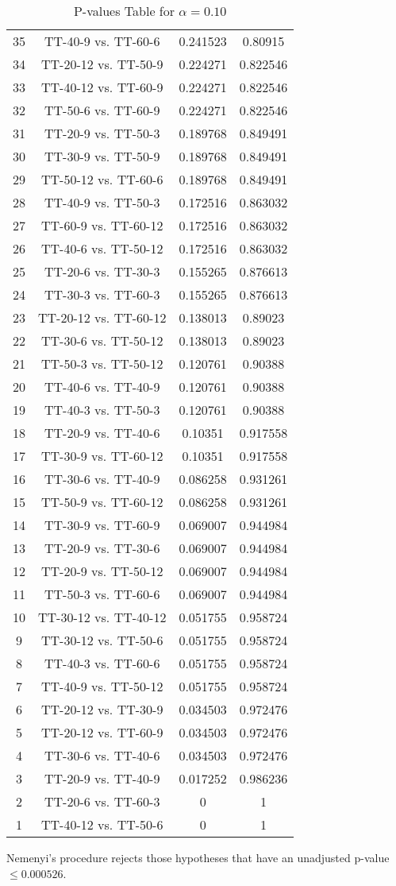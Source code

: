 \documentclass[a4paper,10pt]{article}
\begin{document}
\begin{landscape}
\begin{table}[!htp]
\begin{tabular}{cccc}
35&TT-40-9 vs. TT-60-6&0.241523&0.80915\\
34&TT-20-12 vs. TT-50-9&0.224271&0.822546\\
33&TT-40-12 vs. TT-60-9&0.224271&0.822546\\
32&TT-50-6 vs. TT-60-9&0.224271&0.822546\\
31&TT-20-9 vs. TT-50-3&0.189768&0.849491\\
30&TT-30-9 vs. TT-50-9&0.189768&0.849491\\
29&TT-50-12 vs. TT-60-6&0.189768&0.849491\\
28&TT-40-9 vs. TT-50-3&0.172516&0.863032\\
27&TT-60-9 vs. TT-60-12&0.172516&0.863032\\
26&TT-40-6 vs. TT-50-12&0.172516&0.863032\\
25&TT-20-6 vs. TT-30-3&0.155265&0.876613\\
24&TT-30-3 vs. TT-60-3&0.155265&0.876613\\
23&TT-20-12 vs. TT-60-12&0.138013&0.89023\\
22&TT-30-6 vs. TT-50-12&0.138013&0.89023\\
21&TT-50-3 vs. TT-50-12&0.120761&0.90388\\
20&TT-40-6 vs. TT-40-9&0.120761&0.90388\\
19&TT-40-3 vs. TT-50-3&0.120761&0.90388\\
18&TT-20-9 vs. TT-40-6&0.10351&0.917558\\
17&TT-30-9 vs. TT-60-12&0.10351&0.917558\\
16&TT-30-6 vs. TT-40-9&0.086258&0.931261\\
15&TT-50-9 vs. TT-60-12&0.086258&0.931261\\
14&TT-30-9 vs. TT-60-9&0.069007&0.944984\\
13&TT-20-9 vs. TT-30-6&0.069007&0.944984\\
12&TT-20-9 vs. TT-50-12&0.069007&0.944984\\
11&TT-50-3 vs. TT-60-6&0.069007&0.944984\\
10&TT-30-12 vs. TT-40-12&0.051755&0.958724\\
9&TT-30-12 vs. TT-50-6&0.051755&0.958724\\
8&TT-40-3 vs. TT-60-6&0.051755&0.958724\\
7&TT-40-9 vs. TT-50-12&0.051755&0.958724\\
6&TT-20-12 vs. TT-30-9&0.034503&0.972476\\
5&TT-20-12 vs. TT-60-9&0.034503&0.972476\\
4&TT-30-6 vs. TT-40-6&0.034503&0.972476\\
3&TT-20-9 vs. TT-40-9&0.017252&0.986236\\
2&TT-20-6 vs. TT-60-3&0&1\\
1&TT-40-12 vs. TT-50-6&0&1\\
\hline
\end{tabular}
\caption{P-values Table for $\alpha=0.10$}
\end{table}Nemenyi's procedure rejects those hypotheses that have an unadjusted p-value $\le0.000526$.


\end{landscape}
\end{document}

